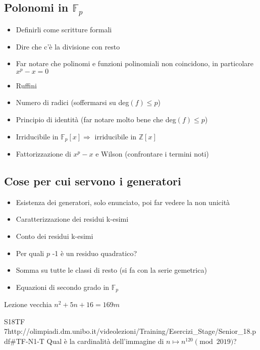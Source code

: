 \documentclass[12pt]{article}
\begin{document}
\subsection{Polonomi in $\mathbb{F}_{p}$}
\begin{itemize}
	\item Definirli come scritture formali
	\item Dire che c'è la divisione con resto
	\item Far notare che polinomi e funzioni polinomiali non coincidono, in particolare $x^{p}-x=0$
	\item Ruffini
	\item Numero di radici (soffermarsi su deg$(f)\le p$)
	\item Principio di identità (far notare molto bene che deg$(f)\le p$)
	\item Irriducibile in $\mathbb{F}_{p}[x]\Rightarrow$ irriducibile in $\mathbb{Z}[x]$
	\item Fattorizzazione di $x^{p}-x$ e Wilson (confrontare i termini noti)
\end{itemize}

\subsection{Cose per cui servono i generatori}
\begin{itemize}
	\item Esistenza dei generatori, solo enunciato, poi far vedere la non unicità
	\item Caratterizzazione dei residui k-esimi
	\item Conto dei residui k-esimi
	\item Per quali $p$ -1 è un residuo quadratico?
	\item Somma su tutte le classi di resto (si fa con la serie gemetrica)
	\item Equazioni di secondo grado in $\mathbb{F}_{p}$
\end{itemize}

\begin{esercizio}{Lezione vecchia}{}
    $n^2+5n+16=169m$
\end{esercizio}

\begin{esercizio}{S18TF 7}{http://olimpiadi.dm.unibo.it/videolezioni/Training/Esercizi_Stage/Senior_18.pdf\#TF-N1-T}
    Qual è la cardinalità dell'immagine di $n\mapsto n^{120}\pmod{2019}$?
\end{esercizio}
\end{document}
